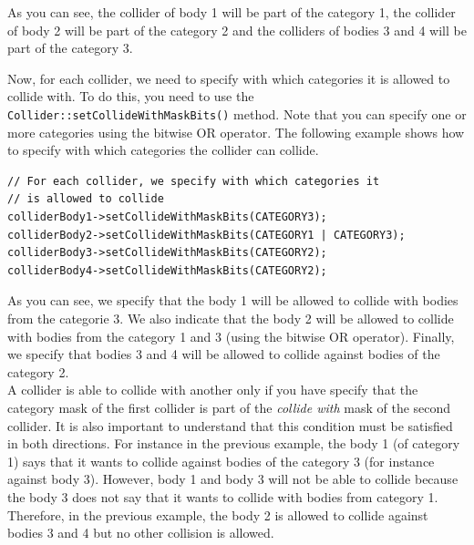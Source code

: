 \documentclass[a4paper,12pt]{article}
\begin{document}
    As you can see, the collider of body 1 will be part of the category 1, the collider of body 2 will be part of the category 2 and the colliders of
    bodies 3 and 4 will be part of the category 3. \\

    \begin{sloppypar}
    Now, for each collider, we need to specify with which categories it is allowed to collide with. To do this, you need to use the 
    \texttt{Collider::setCollideWithMaskBits()} method. Note that you can specify one or more categories using the bitwise OR operator. The
    following example shows how to specify with which categories the collider can collide. \\
    \end{sloppypar}

    \begin{lstlisting}
// For each collider, we specify with which categories it
// is allowed to collide
colliderBody1->setCollideWithMaskBits(CATEGORY3);
colliderBody2->setCollideWithMaskBits(CATEGORY1 | CATEGORY3);
colliderBody3->setCollideWithMaskBits(CATEGORY2);
colliderBody4->setCollideWithMaskBits(CATEGORY2);
  \end{lstlisting}

    \vspace{0.6cm}

    As you can see, we specify that the body 1 will be allowed to collide with bodies from the categorie 3. We also indicate that the body 2 will be
    allowed to collide with bodies from the category 1 and 3 (using the bitwise OR operator). Finally, we specify that bodies 3 and 4 will be allowed
    to collide against bodies of the category 2. \\

    A collider is able to collide with another only if you have specify that the category mask of the first collider is part of the
    \emph{collide with} mask of the second collider. It is also important to understand that this condition must be satisfied in both directions. For
    instance in the previous example, the body 1 (of category 1) says that it wants to collide against bodies of the category 3 (for instance against
    body 3). However, body 1 and body 3 will not be able to collide because the body 3 does not say that it wants to collide
    with bodies from category 1. Therefore, in the previous example, the body 2 is allowed to collide against bodies 3 and 4 but no other collision
    is allowed. \\
\end{document}
